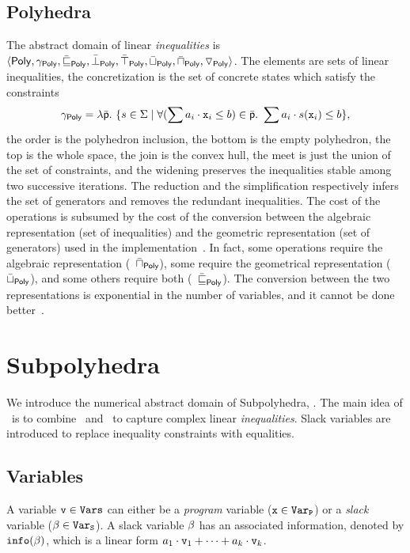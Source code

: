 \documentclass[sttt]{svjour}
\begin{document}
\subsection{Polyhedra}
The abstract domain of linear \emph{inequalities} is   $\langle \mathsf{Poly}, \gamma_{\mathsf{Poly}},\allowbreak \bar{\sqsubseteq}_{\mathsf{Poly}}, \bar{\bot}_{\mathsf{Poly}}, \allowbreak \bar{\top}_{\mathsf{Poly}}, \bar{\sqcup}_{\mathsf{Poly}}, \bar{\sqcap}_{\mathsf{Poly}}, \triangledown_{\mathsf{Poly}} \rangle$.
The elements are sets of linear inequalities, the concretization is the set of concrete states which satisfy the constraints 
 \ie\ 
\[
\gamma_{\mathsf{Poly}} = \lambda \bar{\mathsf{\mathsf{p}}}.\ \{ s \in \Sigma \mid \forall (\sum a_i \cdot \mathtt{x}_i \leq b) \in \bar{\mathsf{\mathsf{p}}}.\ \sum a_i \cdot s(\mathtt{x}_i) \leq b  \},
\]
 the order is the polyhedron inclusion, the bottom is the empty polyhedron, the top is the whole space, the join is the convex hull, the meet is just the union of the set of constraints, and the widening preserves the inequalities stable  among two successive iterations.
The reduction and the simplification respectively infers the set of generators  and removes the redundant inequalities.
The cost of the \Polyhedra{} operations is subsumed by the cost of the conversion between the algebraic representation (set of inequalities) and the geometric representation (set of generators) used in the implementation~\cite{PPL}.
In fact, some operations  require the algebraic representation  (\eg\ $\bar{\sqcap}_{\mathsf{Poly}}$), some require the geometrical representation (\eg\ $\bar{\sqcup}_{\mathsf{Poly}}$), and some others require both (\eg\ $\bar{\sqsubseteq}_{\mathsf{Poly}}$).
The conversion between the two representations is exponential in the number of variables, and it cannot be done better~\cite{KhachiyanBBEG06}.

\section{Subpolyhedra}

We introduce the numerical abstract domain of Subpolyhedra, \Subpoly.
The main idea of \Subpoly\ is to combine \Intervals\ and \Lineq\ to capture complex linear \emph{inequalities}.
Slack variables are introduced to replace inequality constraints with equalities. 


\subsection{Variables}
A variable $\mathtt{v} \in \mathtt{Vars}$ can  either be  a \emph{program} variable ($\mathtt{x} \in \mathtt{Var}_\mathtt{P}$) or a \emph{slack} variable ($\beta_{} \in \mathtt{Var}_\mathtt{S}$).
A slack variable $\beta_{}$  has an associated information, denoted by $\mathtt{info}(\beta_{})$,  which is a linear form  $a_1 \cdot \mathtt{v}_1 + \dots + a_k \cdot \mathtt{v}_k$.
\end{document}

